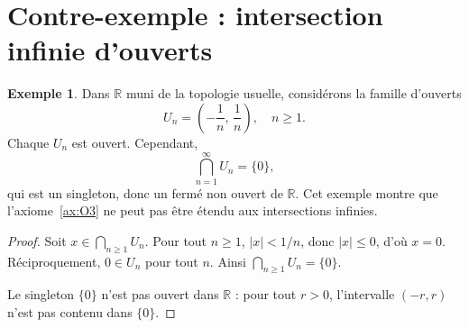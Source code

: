 \documentclass[12pt,a4paper,openany]{book}
\theoremstyle{definition}
\theoremstyle{cours}
\theoremstyle{coursnormal}
\newtheorem{exemple}[theoreme]{Exemple}
\newcommand{\R}{\mathbb{R}}
\begin{document}
\begin{center}
\end{center}

\section{Contre-exemple : intersection infinie d'ouverts}
\label{sec:contre-exemple-intersection}

\begin{exemple}\label{ex:intersection-infinie-ouverts}
  Dans $\R$ muni de la topologie usuelle, considérons la famille d'ouverts
  \[
    U_n = \left(-\frac{1}{n},\, \frac{1}{n}\right), \quad n \geq 1.
  \]
  Chaque $U_n$ est ouvert. Cependant,
  \[
    \bigcap_{n=1}^{\infty} U_n = \{0\},
  \]
  qui est un singleton, donc un fermé non ouvert de $\R$. Cet exemple montre que l'axiome~\ref{ax:O3} ne peut pas être étendu aux intersections infinies.
\end{exemple}

\begin{proof}
  Soit $x \in \bigcap_{n \geq 1} U_n$. Pour tout $n \geq 1$, $|x| < 1/n$, donc $|x| \leq 0$, d'où $x = 0$. Réciproquement, $0 \in U_n$ pour tout $n$. Ainsi $\bigcap_{n \geq 1} U_n = \{0\}$.

  Le singleton $\{0\}$ n'est pas ouvert dans $\R$ : pour tout $r > 0$, l'intervalle $(-r,r)$ n'est pas contenu dans $\{0\}$.
\end{proof}
\end{document}
